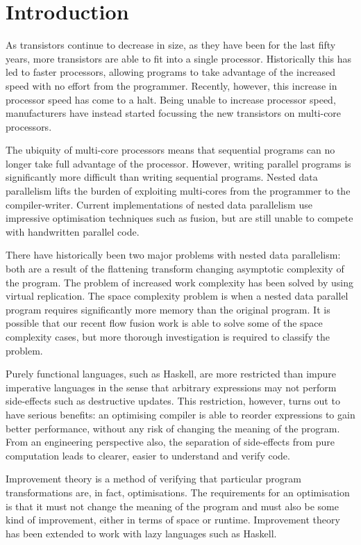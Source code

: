 
\section{Introduction}
As transistors continue to decrease in size, as they have been for the last fifty years, more transistors are able to fit into a single processor.
Historically this has led to faster processors, allowing programs to take advantage of the increased speed with no effort from the programmer.
Recently, however, this increase in processor speed has come to a halt.
Being unable to increase processor speed, manufacturers have instead started focussing the new transistors on multi-core processors.

The ubiquity of multi-core processors means that sequential programs can no longer take full advantage of the processor.
However, writing parallel programs is significantly more difficult than writing sequential programs.
Nested data parallelism\cite{blelloch1995nesl} lifts the burden of exploiting multi-cores from the programmer to the compiler-writer.
Current implementations of nested data parallelism use impressive optimisation techniques such as fusion\cite{lippmeier2013flow}, but are still unable to compete with handwritten parallel code.

There have historically been two major problems with nested data parallelism:
both are a result of the flattening transform changing asymptotic complexity of the program.
The problem of increased work complexity has been solved by using virtual replication\cite{lippmeier2012work}.
The space complexity problem is when a nested data parallel program requires
significantly more memory than the original program\cite{spoonhower2008space}.
It is possible that our recent flow fusion work\cite{lippmeier2013flow}
is able to solve some of the space complexity cases,
but more thorough investigation is required to classify the problem.

Purely functional languages, such as Haskell, are more restricted than impure imperative languages
in the sense that arbitrary expressions may not perform side-effects such as destructive updates.
This restriction, however, turns out to have serious benefits:
an optimising compiler is able to reorder expressions to gain better performance,
without any risk of changing the meaning of the program.
From an engineering perspective also, the separation of side-effects from pure computation leads to clearer, easier to understand and verify code.

Improvement theory\cite{sands1998improvement} is a method of verifying that particular
program transformations are, in fact, optimisations.
The requirements for an optimisation is that it must not change the meaning of the program
and must also be some kind of improvement, either in terms of space or runtime.
Improvement theory has been extended to work with lazy languages such as Haskell\cite{moran1999improvement}.

